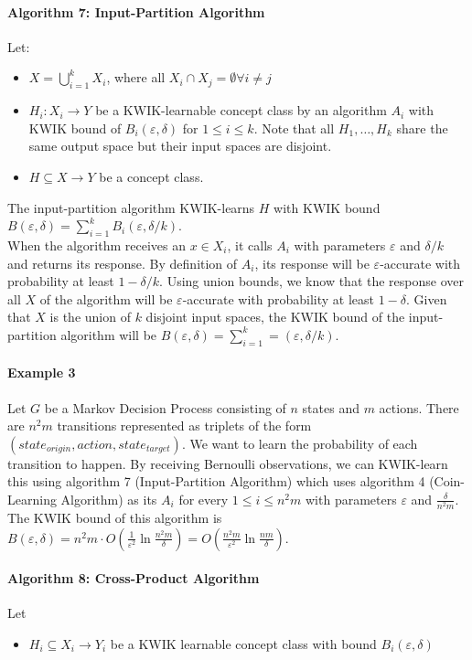 \paragraph{Algorithm 7: Input-Partition Algorithm}
Let:
\begin{itemize}
  \item $X = \bigcup_{i=1}^k X_i$, where all $X_i \cap X_j = \emptyset \forall i \neq j$
  \item $H_i: X_i \to Y$ be a KWIK-learnable concept class by an algorithm $A_i$
  with KWIK bound of $B_i(\varepsilon, \delta)$ for $1 \leq i \leq k$. Note
  that all $H_1, \ldots, H_k$ share the same output space but their input spaces
  are disjoint.
  \item $H \subseteq X \to Y$ be a concept class.
\end{itemize}

The input-partition algorithm KWIK-learns $H$ with KWIK bound $B(\varepsilon,
\delta) = \sum_{i=1}^k B_i(\varepsilon, \delta/k)$. \\

When the algorithm receives an $x \in X_i$, it calls $A_i$ with parameters
$\varepsilon$ and $\delta/k$ and returns its response. By definition of $A_i$,
its response will be $\varepsilon$-accurate with probability at least $1 -
\delta/k$. Using union bounds, we know that the response over all $X$ of the
algorithm will be $\varepsilon$-accurate with probability at least $1 - \delta$.
Given that $X$ is the union of $k$ disjoint input spaces, the KWIK bound
of the input-partition algorithm will be $B(\varepsilon, \delta) = \sum_{i=1}^k
= (\varepsilon, \delta/k)$.

\paragraph{Example 3} Let $G$ be a Markov Decision Process consisting of $n$
states and $m$ actions. There are $n^2m$ transitions represented as triplets of
the form $(state_{origin}, action, state_{target})$. We want to learn the
probability of each transition to happen. By receiving Bernoulli observations,
we can KWIK-learn this using algorithm 7 (Input-Partition Algorithm) which
uses algorithm 4 (Coin-Learning Algorithm) as its $A_i$ for every $1 \leq i \leq
n^2m$ with parameters $\varepsilon$ and $\frac{\delta}{n^2m}$. The KWIK bound of
this algorithm is $B(\varepsilon, \delta) = n^2m \cdot O(\frac{1}{\varepsilon^2}
\ln \frac{n^2m}{\delta}) = O(\frac{n^2m}{\varepsilon^2} \ln \frac{nm}{\delta})$.

\paragraph{Algorithm 8: Cross-Product Algorithm}
Let
\begin{itemize}
  \item $H_i \subseteq X_i \to Y_i$ be a KWIK learnable concept class with bound $B_i(\varepsilon, \delta)$
\end{itemize}

